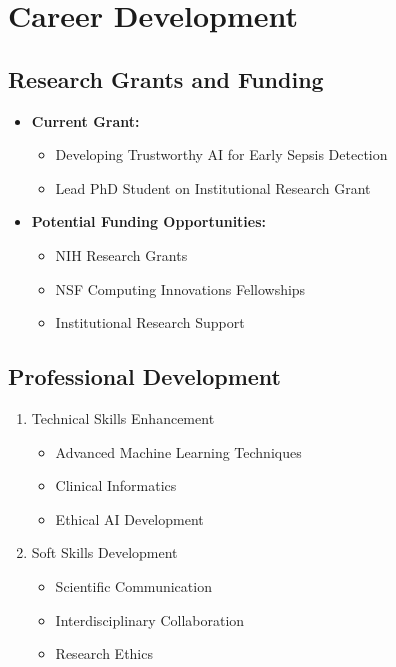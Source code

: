 \chapter{Career Development}

\section{Research Grants and Funding}
\begin{itemize}
    \item \textbf{Current Grant:}
    \begin{itemize}
        \item Developing Trustworthy AI for Early Sepsis Detection
        \item Lead PhD Student on Institutional Research Grant
    \end{itemize}
    
    \item \textbf{Potential Funding Opportunities:}
    \begin{itemize}
        \item NIH Research Grants
        \item NSF Computing Innovations Fellowships
        \item Institutional Research Support
    \end{itemize}
\end{itemize}

\section{Professional Development}
\begin{enumerate}
    \item Technical Skills Enhancement
    \begin{itemize}
        \item Advanced Machine Learning Techniques
        \item Clinical Informatics
        \item Ethical AI Development
    \end{itemize}
    
    \item Soft Skills Development
    \begin{itemize}
        \item Scientific Communication
        \item Interdisciplinary Collaboration
        \item Research Ethics
    \end{itemize}
\end{enumerate}

